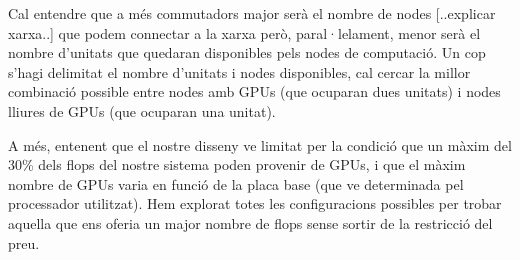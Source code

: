 Cal entendre que a més commutadors major serà el nombre de nodes [..explicar xarxa..] que podem connectar a la xarxa però, paral·lelament, menor serà el nombre d'unitats que quedaran disponibles pels nodes de computació. Un cop s'hagi delimitat el nombre d'unitats i nodes disponibles, cal cercar la millor combinació possible entre nodes amb GPUs (que ocuparan dues unitats) i nodes lliures de GPUs (que ocuparan una unitat).

A més, entenent que el nostre disseny ve limitat per la condició que un màxim del 30\% dels flops del nostre sistema poden provenir de GPUs, i que el màxim nombre de GPUs varia en funció de la placa base (que ve determinada pel processador utilitzat). Hem explorat totes les configuracions possibles per trobar aquella que ens oferia un major nombre de flops sense sortir de la restricció del preu.



